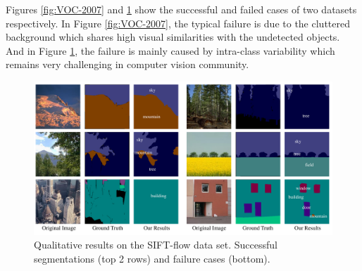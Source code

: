 Figures \ref{fig:VOC-2007} and \ref{fig:SIFT-flow} show the successful and failed cases of two datasets respectively. In Figure \ref{fig:VOC-2007}, the typical failure is due to the cluttered background which shares high visual similarities with the undetected objects. And in Figure \ref{fig:SIFT-flow}, the failure is mainly caused by intra-class variability which remains very challenging in computer vision community.

\begin{figure}
\begin{center}
    \includegraphics[width=0.9\linewidth]{Fig_SIFTflow.pdf}
\end{center}
\caption{Qualitative results on the SIFT-flow data set. Successful segmentations (top 2 rows) and failure cases (bottom).}
\label{fig:SIFT-flow}
\end{figure}

